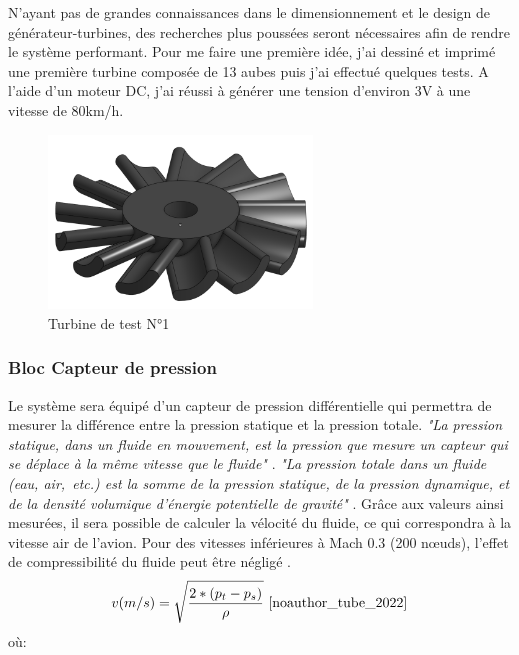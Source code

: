         
        \newpage
        \noindent N'ayant pas de grandes connaissances dans le dimensionnement et le design de générateur-turbines, des recherches plus poussées seront nécessaires afin de rendre le système performant. Pour me faire une première idée, j'ai dessiné et imprimé une première turbine composée de 13 aubes puis j'ai effectué quelques tests. A l'aide d'un moteur DC, j'ai réussi à générer une tension d'environ 3V à une vitesse de 80km/h.

        \begin{figure}[h]
            \caption{Turbine de test N°1}
            \centering
            \includegraphics[width=7cm]{Images/TurbineTest.png}
        \end{figure}
        \vspace{1 cm}
    
    \subsubsection{Bloc Capteur de pression}
        Le système sera équipé d'un capteur de pression différentielle qui permettra de mesurer la différence entre la pression statique et la pression totale.
        \emph{"La pression statique, dans un fluide en mouvement, est la pression que mesure un capteur qui se déplace à la même vitesse que le fluide"} \cite{noauthor_pression_2020}.
        \emph{"La pression totale dans un fluide (eau, air, etc.) est la somme de la pression statique, de la pression dynamique, et de la densité volumique d'énergie potentielle de gravité"} \cite{noauthor_pression_2022}. Grâce aux valeurs ainsi mesurées, il sera possible de calculer la vélocité du fluide, ce qui correspondra à la vitesse air de l'avion. Pour des vitesses inférieures à Mach 0.3 (200 nœuds), l'effet de compressibilité du fluide peut être négligé \cite{noauthor_tube_2022}.
        \begin{equation}
            v(m/s) = \sqrt{\frac{2*(p_{t}-p_{s})}{\rho}} \text{ \cite{noauthor_tube_2022}}
        \end{equation}
        où:
        
